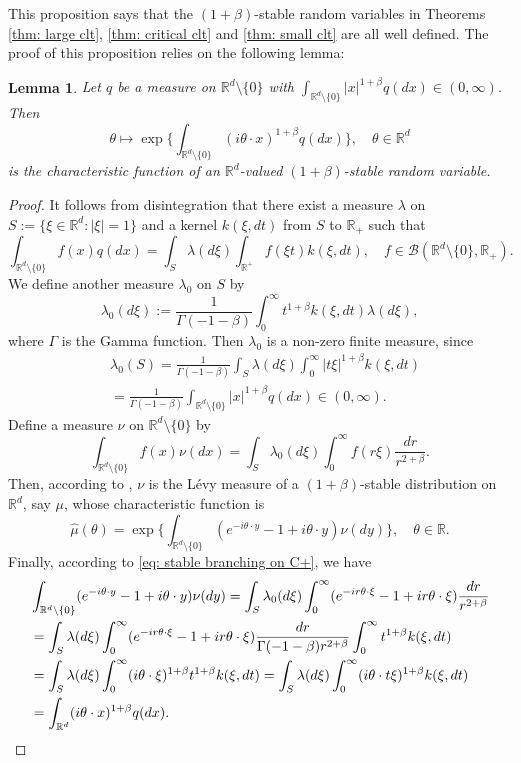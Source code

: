 \documentclass[12pt,a4paper]{amsart}
\theoremstyle{plain}
\newtheorem{lem}[thm]{Lemma}
\theoremstyle{definition}
\numberwithin{equation}{section}
\begin{document}
    This proposition says that the $(1+\beta)$-stable random variables  in Theorems \ref{thm: large clt}, \ref{thm: critical clt} and \ref{thm: small clt} are all well defined.
    The proof of this proposition relies on the following lemma:
\begin{lem}
\label{lem: charactreisticfunction}
    Let $q$ be a measure on $\mathbb R^d\setminus\{0\}$ with
    $\int_{\mathbb R^d\setminus\{0\}} |x|^{1+\beta} q(dx) \in (0,\infty)$.
    Then
\[
    \theta \mapsto  \exp\Big\{\int_{\mathbb R^d\setminus\{0\}} (i\theta \cdot x)^{1+\beta} q(dx)\Big\},
    \quad \theta \in \mathbb R^d
\]
    is the characteristic function of an $\mathbb R^d$-valued $(1+\beta)$-stable random variable.
\end{lem}
\begin{proof}
    It follows from disintegration that there exist a measure $\lambda$ on $S:= \{\xi\in \mathbb R^d:|\xi| = 1\}$ and a kernel $k(\xi,dt)$ from $S$ to $\mathbb R_+$ such that
\[
    \int_{\mathbb R^d\setminus \{0\}} f(x)q(dx) = \int_S \lambda(d\xi) \int_{\mathbb R^+} f(\xi t)k(\xi,dt),\quad
    f\in \mathcal B(\mathbb R^d\setminus \{0\}, \mathbb R_+).
\]
    We define another measure $\lambda_0$ on $S$ by
\[
    \lambda_0(d\xi) := \frac1{\Gamma(-1-\beta)}\int_0^\infty t^{1+\beta}k(\xi,dt) \lambda (d\xi),
\]
        where $\Gamma$ is the Gamma function.
    Then $\lambda_0$ is a non-zero finite measure, since
\begin{align}
    &\lambda_0(S) = \frac{1}{\Gamma(-1-\beta)} \int_S \lambda (d\xi) \int_0^\infty |t\xi|^{1+\beta}k(\xi,dt)
    \\&= \frac{1}{\Gamma(-1-\beta)} \int_{\mathbb R^d\setminus\{0\}} |x|^{1+\beta} q(dx) \in (0,\infty).
\end{align}
    Define a measure $\nu$ on $\mathbb R^d\setminus\{0\}$ by
\[
    \int_{\mathbb R^d\setminus\{0\}}f(x)\nu(dx)= \int_{S} \lambda_0(d\xi) \int_0^\infty f(r\xi) \frac{dr}{r^{2+\beta}} .
\]
        Then, according to \cite[Remark 14.4]{Sato2013Levy}, $\nu$ is the L\'evy measure of a $(1+\beta)$-stable distribution on $\mathbb R^d$, say $\mu$, whose characteristic function is
\[
    \hat \mu(\theta)
    =\exp\Big\{\int_{\mathbb R^d\setminus\{0\}} (e^{-i\theta \cdot y}-1+i\theta \cdot y) \nu(dy)\Big\},
    \quad \theta \in \mathbb R.
\]
	    Finally, according to \eqref{eq: stable branching on C+}, we have
\begin{align}
    &\int_{\mathbb R^d\setminus\{0\}} (e^{-i\theta \cdot y}-1+i\theta \cdot y) \nu(dy)
    = \int_S \lambda_0(d\xi) \int_0^\infty (e^{-ir\theta \cdot \xi}-1+ir\theta \cdot \xi) \frac{dr}{r^{2+\beta}}
    \\& = \int_S \lambda (d\xi) \int_0^\infty (e^{-ir\theta \cdot \xi}-1+ir\theta \cdot \xi) \frac{dr}{\Gamma(-1-\beta)r^{2+\beta}}\int_0^\infty t^{1+\beta} k(\xi,dt)
    \\& = \int_S \lambda (d\xi) \int_0^\infty (i\theta\cdot \xi)^{1+\beta} t^{1+\beta} k(\xi,dt)
    = \int_S \lambda(d\xi) \int_0^\infty (i\theta \cdot t\xi)^{1+\beta} k(\xi,dt)
    \\& = \int_{\mathbb R^d} (i\theta \cdot x)^{1+\beta} q(dx).
    \qedhere
\end{align}
\end{proof}
\end{document}
